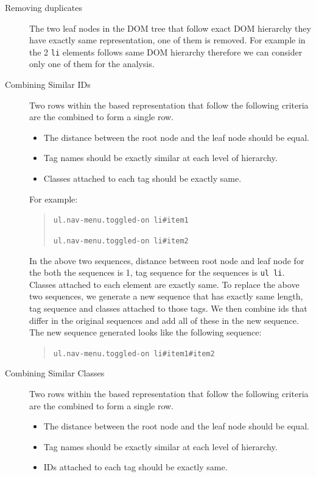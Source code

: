 		\begin{description}
			\item[Removing duplicates]
			The two leaf nodes in the DOM tree that follow exact DOM hierarchy \ie they have exactly same \css representation, one of them is removed. For example in  the 2 \texttt{li} elements follows same DOM hierarchy therefore we can consider only one of them for the analysis.
		
			\item[Combining Similar IDs]
			Two rows within the \css based representation that follow the following criteria are the combined to form a single row. 

			\begin{itemize}
				\item The distance between the root node and the leaf node should be equal.
				\item Tag names should be exactly similar at each level of hierarchy.
				\item Classes attached to each tag should be exactly same.
			\end{itemize}

			For example:
			
			\begin{quote}
				\texttt{ul.nav-menu.toggled-on li\#item1}
	
				\texttt{ul.nav-menu.toggled-on li\#item2}
			\end{quote}

			In the above two sequences, distance between root node and leaf node for the both the sequences is 1, tag sequence for the sequences is \texttt{ul li}. Classes attached to each element are exactly same. To replace the above two sequences, we generate a new sequence that has exactly same length, tag sequence and classes attached to those tags. We then combine ids that differ in the original sequences and add all of these in the new sequence. The new sequence generated looks like the following sequence:

			\begin{quote}
				\texttt{ul.nav-menu.toggled-on li\#item1\#item2}
			\end{quote}

			\item[Combining Similar Classes]
			Two rows within the \css based representation that follow the following criteria are the combined to form a single row. 
			
			\begin{itemize}
				\item The distance between the root node and the leaf node should be equal.
				\item Tag names should be exactly similar at each level of hierarchy.
				\item IDs attached to each tag should be exactly same.
			\end{itemize}


\end{description}
